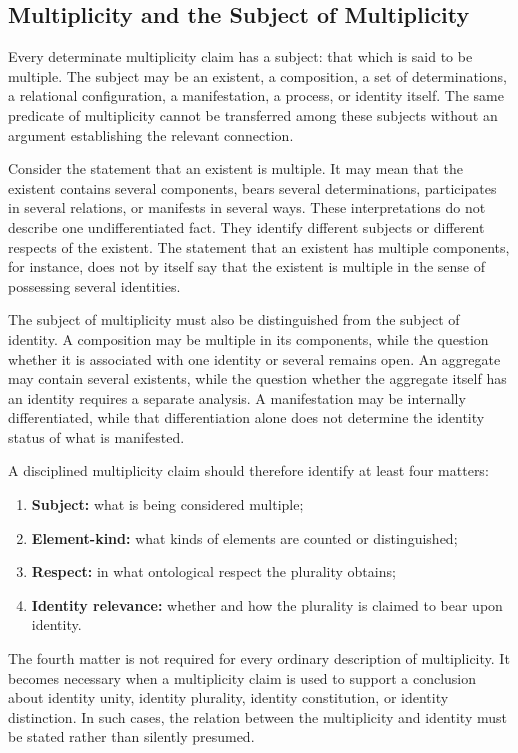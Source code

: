 \subsection{Multiplicity and the Subject of Multiplicity}

Every determinate multiplicity claim has a subject: that which is
said to be multiple. The subject may be an existent, a composition,
a set of determinations, a relational configuration, a manifestation,
a process, or identity itself. The same predicate of multiplicity
cannot be transferred among these subjects without an argument
establishing the relevant connection.

Consider the statement that an existent is multiple. It may mean
that the existent contains several components, bears several
determinations, participates in several relations, or manifests in
several ways. These interpretations do not describe one
undifferentiated fact. They identify different subjects or different
respects of the existent. The statement that an existent has multiple
components, for instance, does not by itself say that the existent
is multiple in the sense of possessing several identities.

The subject of multiplicity must also be distinguished from the
subject of identity. A composition may be multiple in its components,
while the question whether it is associated with one identity or
several remains open. An aggregate may contain several existents,
while the question whether the aggregate itself has an identity
requires a separate analysis. A manifestation may be internally
differentiated, while that differentiation alone does not determine
the identity status of what is manifested.

A disciplined multiplicity claim should therefore identify at least
four matters:

\begin{enumerate}
    \item \textbf{Subject:} what is being considered multiple;
    \item \textbf{Element-kind:} what kinds of elements are counted
    or distinguished;
    \item \textbf{Respect:} in what ontological respect the plurality
    obtains;
    \item \textbf{Identity relevance:} whether and how the plurality
    is claimed to bear upon identity.
\end{enumerate}

The fourth matter is not required for every ordinary description of
multiplicity. It becomes necessary when a multiplicity claim is used
to support a conclusion about identity unity, identity plurality,
identity constitution, or identity distinction. In such cases, the
relation between the multiplicity and identity must be stated rather
than silently presumed.

